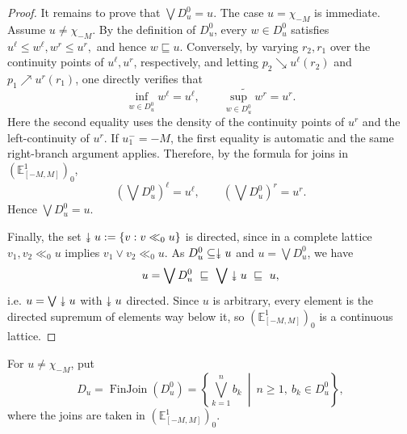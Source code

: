 \documentclass[preprint,3p,times]{elsarticle}
\theoremstyle{plain}
\theoremstyle{definition}
\newcommand{\twoheaddownarrow}{\mathrel{\rotatebox[origin=c]{-90}{$\twoheadrightarrow$}}}
\numberwithin{equation}{section}
\begin{document}
\begin{proof}
It remains to prove that \(\bigvee D_u^0=u\). The case
\(u=\chi_{-M}\) is immediate. Assume \(u\ne\chi_{-M}\).
By the definition of \(D_u^0\), every \(w\in D_u^0\) satisfies
\(
u^\ell\le w^\ell, w^r\le u^r,
\)
and hence \(w\sqsubseteq u\).
Conversely, by varying \(r_2,r_1\) over the continuity points of
\(u^\ell,u^r\), respectively, and letting
\(p_2\searrow u^\ell(r_2)\) and
\(p_1\nearrow u^r(r_1)\), one directly verifies that
\[
\inf_{w\in D_u^0}w^\ell=u^\ell,
\qquad
\widetilde{\sup_{w\in D_u^0}w^r}=u^r.
\]
Here the second equality uses the density of the continuity points
of \(u^r\) and the left-continuity of \(u^r\). If \(u_1^-=-M\),
the first equality is automatic and the same right-branch argument
applies. Therefore, by the formula for joins in
\((\mathbb E^1_{[-M,M]})_0\),
\[
\left(\bigvee D_u^0\right)^\ell=u^\ell,
\qquad
\left(\bigvee D_u^0\right)^r=u^r.
\]
Hence \(\bigvee D_u^0=u\).

Finally, the set $\twoheaddownarrow u:=\{v:v\ll_0 u\}$ is directed, since in a complete lattice
$v_1,v_2\ll_0 u$ implies $v_1\vee v_2\ll_0 u$. As $D_u^0\subseteq\twoheaddownarrow u$ and
$u=\bigvee D_u^0$, we have
\[
u=\bigvee D_u^0\ \sqsubseteq\ \bigvee\twoheaddownarrow u\ \sqsubseteq\ u,
\]
i.e. $u=\bigvee\twoheaddownarrow u$ with $\twoheaddownarrow u$ directed. Since $u$ is arbitrary, every
element is the directed supremum of elements way below it, so $(\mathbb{E}^1_{[-M,M]})_0$
is a continuous lattice.
\end{proof}
For \(u\ne\chi_{-M}\), put
\[
D_u=\operatorname{FinJoin}(D_u^0)
=
\left\{
\bigvee_{k=1}^n b_k
\ \middle|\
n\ge1,\ b_k\in D_u^0
\right\},
\]
where the joins are taken in
\((\mathbb E^1_{[-M,M]})_0\).
\end{document}
